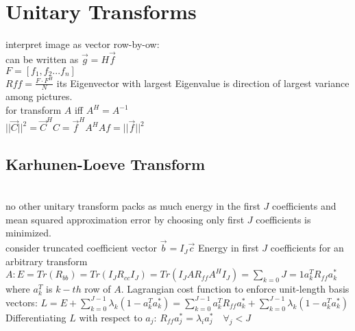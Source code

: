 \section{Unitary Transforms}
 interpret image as vector row-by-ow: \\
 can be written as $\vec{g} = H\vec{f}$\\
 $F = [f_1, f_2... f_n]$\\
 $Rff = \frac{F \cdot F^H}{N}$ its Eigenvector with largest Eigenvalue is direction of largest variance among pictures.\\
 for transform $A$ iff $A^H = A^{-1}$ \\
 $||\vec{C}||^{2} = \vec{C}^{H}C = \vec{f}^{H}A^{H}Af = ||\vec{f}||^{2}$ 

\subsection*{Karhunen-Loeve Transform}
\\
 no other unitary transform packs as much energy in the first $J$ coefficients  and mean squared approximation error by choosing only first $J$ coefficients is minimized.\\
 consider truncated coefficient vector $\vec{b} = I_J \vec{c}$  Energy in first $J$ coefficients for an arbitrary transform $A : E = Tr(R_{bb}) = Tr(I_J R_{cc} I_{J}) = Tr(I_J A R_{ff} A^H I_J) = \sum_{k = 0}{J = 1} a_k^T R_{ff} a_k^*$ where $a_k^T$ is $k-th$ row of $A$. Lagrangian cost function to enforce unit-length basis vectors: 
$L = E + \sum_{k = 0}^{J - 1} \lambda_k (1 - a_k^T a_k^*) = \sum_{k = 0}^{J - 1} a_k^T R_{ff} a_k^* + \sum_{k = 0}^{J - 1} \lambda_k (1 - a_k^T a_k^*)$\\ 
Differentiating $L$ with respect to $a_j$: $R_{ff} a_j^* = \lambda_i a_j^* \quad \forall_j < J$ 
